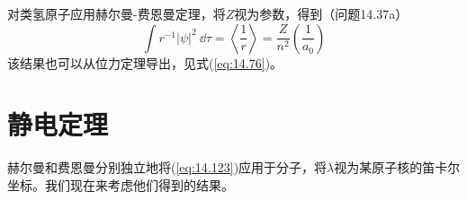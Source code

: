     对类氢原子应用赫尔曼-费恩曼定理，将$Z$视为参数，得到（问题14.37a）
    \begin{equation}
        \int r^{-1} \left|\psi\right|^2\:\dd \tau = \left\langle \frac{1}{r} \right\rangle = \frac{Z}{n^2} \left(\frac{1}{a_0}\right)
        \label{eq:14.125}
    \end{equation}
    该结果也可以从位力定理导出，见式(\ref{eq:14.76})。

\section{静电定理}
\label{sec:14.7 The Electrostatic Theorem}

    赫尔曼和费恩曼分别独立地将(\ref{eq:14.123})应用于分子，将$\lambda$视为某原子核的笛卡尔坐标。我们现在来考虑他们得到的结果。

